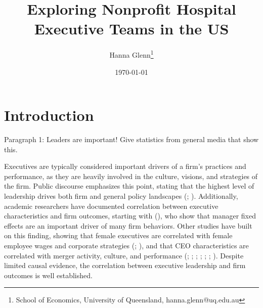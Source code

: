 \documentclass[12pt]{article}
\begin{document}
	
	
	
	
	\linespread{1.2}\title{\vspace{-0.5in} Exploring Nonprofit Hospital Executive Teams in the US} 
	
	\date{\today}
	
	\author{\vspace{10mm}Hanna Glenn\footnote{School of Economics, University of Queensland, hanna.glenn@uq.edu.au} }
	
	\maketitle
	
	\vspace{-0.2in}
	
	\singlespacing\maketitle


 \vspace{3mm}
	
\begin{abstract}
\small{}
\end{abstract}
	
	
	
	
	

	
	\onehalfspacing
	
	\newpage

    \section{Introduction}

    Paragraph 1: Leaders are important! Give statistics from general media that show this. 

    Executives are typically considered important drivers of a firm's practices and performance, as they are heavily involved in the culture, visions, and strategies of the firm. Public discourse emphasizes this point, stating that the highest level of leadership drives both firm and general policy landscapes (\cite{cecchi2024leadership}; \cite{boyles2023organizational}). Additionally, academic researchers have documented correlation between executive characteristics and firm outcomes, starting with \citeauthor{bertrand2003managing} (\citeyear{bertrand2003managing}), who show that manager fixed effects are an important driver of many firm behaviors. Other studies have built on this finding, showing that female executives are correlated with female employee wages and corporate strategies (\cite{flabbi2019female}; \cite{matsa2013female}), and that CEO characteristics are correlated with merger activity, culture, and performance (\cite{levi2010deal}; \cite{benmelech2015military}; \cite{graham2022corporate}; \cite{kaplan2012ceo}; \cite{custodio2013generalists}; \cite{adams2018director}; \cite{frydman2019rising}). Despite limited causal evidence, the correlation between executive leadership and firm outcomes is well established.
\end{document}

